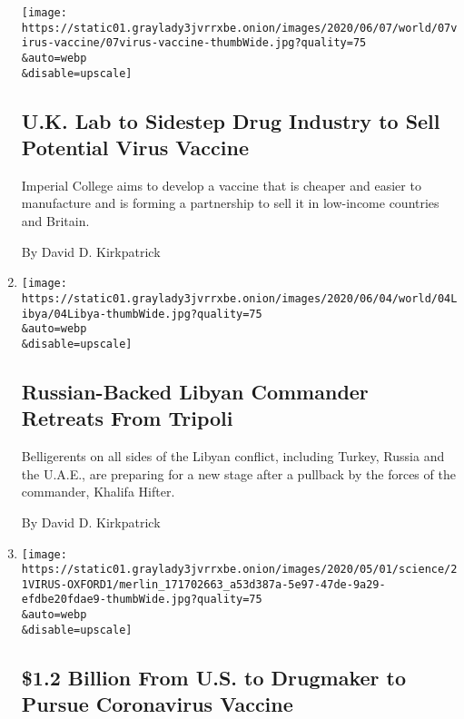 \begin{enumerate}
  \texttt{[image: https://static01.graylady3jvrrxbe.onion/images/2020/06/07/world/07virus-vaccine/07virus-vaccine-thumbWide.jpg?quality=75\\\&auto=webp\\\&disable=upscale]}

  \hypertarget{uk-lab-to-sidestep-drug-industry-to-sell-potential-virus-vaccine}{%
  \subsection{U.K. Lab to Sidestep Drug Industry to Sell Potential Virus
  Vaccine}\label{uk-lab-to-sidestep-drug-industry-to-sell-potential-virus-vaccine}}

  Imperial College aims to develop a vaccine that is cheaper and easier
  to manufacture and is forming a partnership to sell it in low-income
  countries and Britain.

  By David D. Kirkpatrick
\item
  \href{/2020/06/04/world/middleeast/libya-hifter-retreat-russia.html}{}

  \texttt{[image: https://static01.graylady3jvrrxbe.onion/images/2020/06/04/world/04Libya/04Libya-thumbWide.jpg?quality=75\\\&auto=webp\\\&disable=upscale]}

  \hypertarget{russian-backed-libyan-commander-retreats-from-tripoli}{%
  \subsection{Russian-Backed Libyan Commander Retreats From
  Tripoli}\label{russian-backed-libyan-commander-retreats-from-tripoli}}

  Belligerents on all sides of the Libyan conflict, including Turkey,
  Russia and the U.A.E., are preparing for a new stage after a pullback
  by the forces of the commander, Khalifa Hifter.

  By David D. Kirkpatrick
\item
  \href{/2020/05/21/health/coronavirus-vaccine-astrazeneca.html}{}

  \texttt{[image: https://static01.graylady3jvrrxbe.onion/images/2020/05/01/science/21VIRUS-OXFORD1/merlin\_171702663\_a53d387a-5e97-47de-9a29-efdbe20fdae9-thumbWide.jpg?quality=75\\\&auto=webp\\\&disable=upscale]}

  \hypertarget{12-billion-from-us-to-drugmaker-to-pursue-coronavirus-vaccine}{%
  \subsection{\$1.2 Billion From U.S. to Drugmaker to Pursue Coronavirus
  Vaccine}\label{12-billion-from-us-to-drugmaker-to-pursue-coronavirus-vaccine}}


\end{enumerate}

